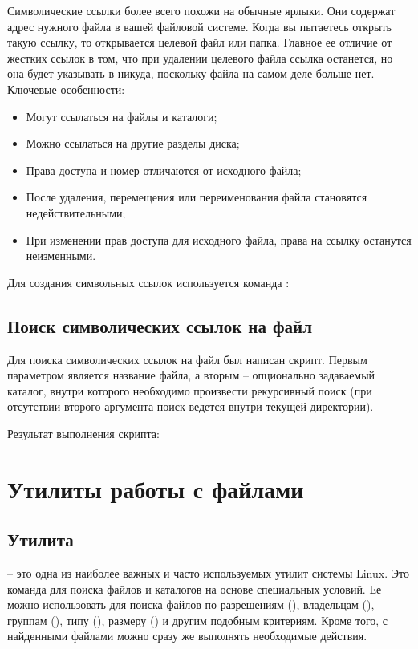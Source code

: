 Символические ссылки более всего похожи на обычные ярлыки. Они содержат адрес нужного файла в вашей файловой системе. Когда вы пытаетесь открыть такую ссылку, то открывается целевой файл или папка. Главное ее отличие от жестких ссылок в том, что при удалении целевого файла ссылка останется, но она будет указывать в никуда, поскольку файла на самом деле больше нет. Ключевые особенности:
\begin{itemize}
	\item Могут ссылаться на файлы и каталоги;
	\item Можно ссылаться на другие разделы диска;
	\item Права доступа и номер  отличаются от исходного файла;
	\item После удаления, перемещения или переименования файла становятся недействительными;
	\item При изменении прав доступа для исходного файла, права на ссылку останутся неизменными.
\end{itemize}

Для создания символьных ссылок используется команда :


\subsection{Поиск символических ссылок на файл}

Для поиска символических ссылок на файл был написан скрипт. Первым параметром является название файла, а вторым -- опционально задаваемый каталог, внутри которого необходимо произвести рекурсивный поиск (при отсутствии второго аргумента поиск ведется внутри текущей директории).


Результат выполнения скрипта:


\section{Утилиты работы с файлами}

\subsection{Утилита }

 -- это одна из наиболее важных и часто используемых утилит системы Linux. Это команда для поиска файлов и каталогов на основе специальных условий. Ее можно использовать для поиска файлов по разрешениям (), владельцам (), группам (), типу (), размеру () и другим подобным критериям. Кроме того, с найденными файлами можно сразу же выполнять необходимые действия.

